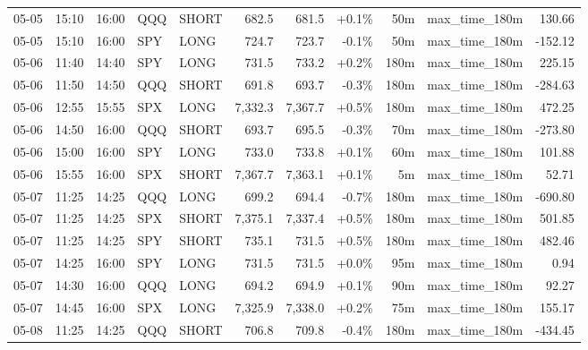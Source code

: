 \documentclass[11pt,a4paper,twoside]{article}
\begin{document}
\begin{center}
\begin{longtable}{>{\color{txtmain}}l l l l l r r r r >{\color{txtmain}}l r}
05-05 & 15:10 & 16:00 & QQQ & SHORT & 682.5 & 681.5 & \textcolor{wingreen}{+0.1\%} & 50m & max\_time\_180m & \textcolor{wingreen}{130.66} \\
05-05 & 15:10 & 16:00 & SPY & LONG & 724.7 & 723.7 & \textcolor{lossred}{-0.1\%} & 50m & max\_time\_180m & \textcolor{lossred}{-152.12} \\
05-06 & 11:40 & 14:40 & SPY & LONG & 731.5 & 733.2 & \textcolor{wingreen}{+0.2\%} & 180m & max\_time\_180m & \textcolor{wingreen}{225.15} \\
05-06 & 11:50 & 14:50 & QQQ & SHORT & 691.8 & 693.7 & \textcolor{lossred}{-0.3\%} & 180m & max\_time\_180m & \textcolor{lossred}{-284.63} \\
05-06 & 12:55 & 15:55 & SPX & LONG & 7,332.3 & 7,367.7 & \textcolor{wingreen}{+0.5\%} & 180m & max\_time\_180m & \textcolor{wingreen}{472.25} \\
05-06 & 14:50 & 16:00 & QQQ & SHORT & 693.7 & 695.5 & \textcolor{lossred}{-0.3\%} & 70m & max\_time\_180m & \textcolor{lossred}{-273.80} \\
05-06 & 15:00 & 16:00 & SPY & LONG & 733.0 & 733.8 & \textcolor{wingreen}{+0.1\%} & 60m & max\_time\_180m & \textcolor{wingreen}{101.88} \\
05-06 & 15:55 & 16:00 & SPX & SHORT & 7,367.7 & 7,363.1 & \textcolor{wingreen}{+0.1\%} & 5m & max\_time\_180m & \textcolor{wingreen}{52.71} \\
05-07 & 11:25 & 14:25 & QQQ & LONG & 699.2 & 694.4 & \textcolor{lossred}{-0.7\%} & 180m & max\_time\_180m & \textcolor{lossred}{-690.80} \\
05-07 & 11:25 & 14:25 & SPX & SHORT & 7,375.1 & 7,337.4 & \textcolor{wingreen}{+0.5\%} & 180m & max\_time\_180m & \textcolor{wingreen}{501.85} \\
05-07 & 11:25 & 14:25 & SPY & SHORT & 735.1 & 731.5 & \textcolor{wingreen}{+0.5\%} & 180m & max\_time\_180m & \textcolor{wingreen}{482.46} \\
05-07 & 14:25 & 16:00 & SPY & LONG & 731.5 & 731.5 & \textcolor{wingreen}{+0.0\%} & 95m & max\_time\_180m & \textcolor{wingreen}{0.94} \\
05-07 & 14:30 & 16:00 & QQQ & LONG & 694.2 & 694.9 & \textcolor{wingreen}{+0.1\%} & 90m & max\_time\_180m & \textcolor{wingreen}{92.27} \\
05-07 & 14:45 & 16:00 & SPX & LONG & 7,325.9 & 7,338.0 & \textcolor{wingreen}{+0.2\%} & 75m & max\_time\_180m & \textcolor{wingreen}{155.17} \\
05-08 & 11:25 & 14:25 & QQQ & SHORT & 706.8 & 709.8 & \textcolor{lossred}{-0.4\%} & 180m & max\_time\_180m & \textcolor{lossred}{-434.45} \\

\end{longtable}
\end{center}
\end{document}
